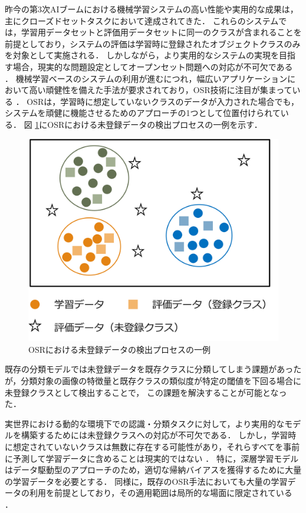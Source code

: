 昨今の第3次AIブームにおける機械学習システムの高い性能や実用的な成果は，主にクローズドセットタスクにおいて達成されてきた．
これらのシステムでは，学習用データセットと評価用データセットに同一のクラスが含まれることを前提としており，システムの評価は学習時に登録されたオブジェクトクラスのみを対象として実施される．
しかしながら，より実用的なシステムの実現を目指す場合，現実的な問題設定としてオープンセット問題への対応が不可欠である \cite{geng2021survey}．
機械学習ベースのシステムの利用が進むにつれ，幅広いアプリケーションにおいて高い頑健性を備えた手法が要求されており，OSR技術に注目が集まっている \cite{sun2023survey}．
OSRは，学習時に想定していないクラスのデータが入力された場合でも，システムを頑健に機能させるためのアプローチの1つとして位置付けられている．
図 \ref{fig:osr}にOSRにおける未登録データの検出プロセスの一例を示す．
% 
\begin{figure}[tbp]
  \centering
  \includegraphics[width=0.6\linewidth, keepaspectratio]{image/osr.png}
  \caption{OSRにおける未登録データの検出プロセスの一例}
  \label{fig:osr}
\end{figure}
% 
既存の分類モデルでは未登録データを既存クラスに分類してしまう課題があったが，分類対象の画像の特徴量と既存クラスの類似度が特定の閾値を下回る場合に未登録クラスとして検出することで，
この課題を解決することが可能となった．

実世界における動的な環境下での認識・分類タスクに対して，より実用的なモデルを構築するためには未登録クラスへの対応が不可欠である．
しかし，学習時に想定されていないクラスは無数に存在する可能性があり，それらすべてを事前に予測して学習データに含めることは現実的ではない \cite{mahdavi2021survey}．
特に，深層学習モデルはデータ駆動型のアプローチのため，適切な帰納バイアスを獲得するために大量の学習データを必要とする．
同様に，既存のOSR手法においても大量の学習データの利用を前提としており，その適用範囲は局所的な場面に限定されている \cite{wang2023}．

